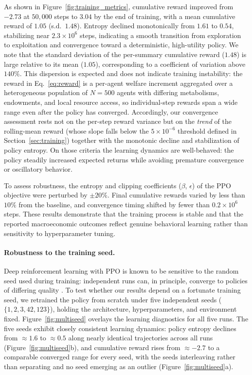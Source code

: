 \documentclass[pdflatex,sn-mathphys-num]{sn-jnl}%
\theoremstyle{thmstyleone}%
\theoremstyle{thmstyletwo}%
\theoremstyle{thmstylethree}%
\begin{document}
As shown in Figure~\ref{fig:training_metrics}, cumulative reward improved from $-2.73$ at $50{,}000$ steps to $3.04$ by the end of training, with a mean cumulative reward of $1.05$ (s.d.\ $1.48$).  
Entropy declined monotonically from $1.61$ to $0.54$, stabilizing near $2.3\times10^{6}$ steps, indicating a smooth transition from exploration to exploitation and convergence toward a deterministic, high-utility policy.  
We note that the standard deviation of the per-summary cumulative reward ($1.48$) is large relative to its mean ($1.05$), corresponding to a coefficient of variation above $140\%$.  
This dispersion is expected and does not indicate training instability: the reward in Eq.~\eqref{eq:reward} is a per-agent welfare increment aggregated over a heterogeneous population of $N = 500$ agents with differing metabolisms, endowments, and local resource access, so individual-step rewards span a wide range even after the policy has converged.  
Accordingly, our convergence assessment rests not on the per-step reward variance but on the \emph{trend} of the rolling-mean reward (whose slope falls below the $5\times10^{-6}$ threshold defined in Section~\ref{sec:training}) together with the monotonic decline and stabilization of policy entropy.  
On those criteria the learning dynamics are well-behaved: the policy steadily increased expected returns while avoiding premature convergence or oscillatory behavior.

To assess robustness, the entropy and clipping coefficients ($\beta$, $\epsilon$) of the PPO objective were perturbed by $\pm 20\%$.  
Final cumulative rewards varied by less than $10\%$ from the baseline, and convergence timing shifted by fewer than $0.2\times10^{6}$ steps.  
These results demonstrate that the training process is stable and that the reported macroeconomic outcomes reflect genuine behavioral learning rather than sensitivity to hyperparameter tuning.

\paragraph{Robustness to the training seed.}
Deep reinforcement learning with PPO is known to be sensitive to the random seed used during training: independent runs can, in principle, converge to policies of differing quality \citep{Henderson2018}.  
To test whether our results depend on a fortunate training seed, we retrained the policy from scratch under five independent seeds ($\{1, 2, 3, 42, 123\}$), holding the architecture, hyperparameters, and environment fixed.  
Figure~\ref{fig:multiseed} overlays the learning diagnostics for all five runs.  
The five seeds exhibit closely consistent learning dynamics: policy entropy declines from $\approx 1.6$ to $\approx 0.5$ along nearly identical trajectories across all runs (Figure~\ref{fig:multiseed}b), and cumulative reward rises from $\approx -2.7$ to a comparable converged range for every seed, with the seeds interleaving rather than separating and no seed emerging as an outlier (Figure~\ref{fig:multiseed}a).  
\end{document}
